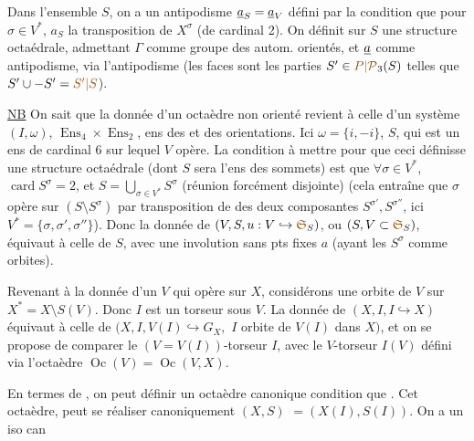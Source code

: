 Dans l'ensemble $S$, on a un antipodisme $\uline{a}_S=\uline{a}_V$
défini par la condition que pour $\sigma\in V^*$, $a_S$  la transposition
de $X^\sigma$ (de cardinal 2). On définit sur $S$ une
structure octaédrale, admettant $\Gamma$ comme groupe des
autom. orientés, et $\uline a$ comme antipodisme, via l'antipodisme
(les faces sont les parties $S'\in\unsure{P|\mathcal P}_3(S)$ telles que $S'\cup-S'=\unsure{S'|S}$).

\uline{NB} On sait que la donnée d'un octaèdre  non orienté
revient à celle d'un système $(I,\omega)$,  $\operatorname{Ens}_4\times\operatorname{Ens}_2$,
ens des  et des orientations. Ici $\omega=\{i,-i\}$, 
$S$, qui est un ens de cardinal 6 sur lequel $V$ opère.
La condition à mettre  pour que ceci définisse une
 structure octaédrale (dont $S$ sera l'ens des sommets)
est que $\forall\sigma\in V^*$,  $\operatorname{card}S^\sigma=2$, et $S=\bigcup_{\sigma\in V^*}S^\sigma$
(réunion forcément disjointe) (cela entraîne que
$\sigma$ opère sur $(S\setminus S^\sigma)$ par transposition de  des deux
composantes $S^{\sigma'},S^{\sigma''}$, ici $V^*=\{\sigma,\sigma',\sigma''\}$). Donc la
donnée de  $(V,S,u:V\hookrightarrow\unsure{\mathfrak S}_S)$, ou $(S,V\subset\unsure{\mathfrak S}_S)$,
équivaut à celle de $S$, avec une involution sans pts fixes
$a$ (ayant les $S^\sigma$ comme orbites).

Revenant à la donnée d'un $V$ qui opère  sur $X$,
considérons une orbite  de $V$ sur $X^*=X\setminus S(V)$.
Donc $I$ est un torseur sous $V$. La donnée de
$(X,I,I\hookrightarrow X)$ équivaut à celle de $(X,I,V(I)\hookrightarrow G_X,$
$I$ orbite de $V(I)$ dans $X)$, et on se propose de
comparer le $(V=V(I))$-torseur $I$, avec le
$V$-torseur $I(V)$  défini via l'octaèdre $\operatorname{Oc}(V)=\operatorname{Oc}(V,X)$.

En termes de , on peut définir un octaèdre 
canonique 
condition que  
.
Cet  octaèdre,  peut
se réaliser canoniquement  $(X,S)$
$=(X(I),S(I))$. On a un iso can

